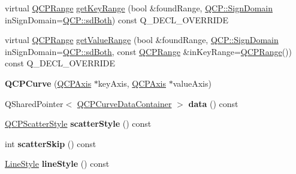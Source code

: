 \begin{DoxyCompactItemize}
\item 
virtual \hyperlink{class_q_c_p_range}{Q\+C\+P\+Range} \hyperlink{class_q_c_p_curve_a22d09087f78f254731197cc0b8783299}{get\+Key\+Range} (bool \&found\+Range, \hyperlink{namespace_q_c_p_afd50e7cf431af385614987d8553ff8a9}{Q\+C\+P\+::\+Sign\+Domain} in\+Sign\+Domain=\hyperlink{namespace_q_c_p_afd50e7cf431af385614987d8553ff8a9a3dee7e9cd2fedce9253b83e172626a6c}{Q\+C\+P\+::sd\+Both}) const Q\+\_\+\+D\+E\+C\+L\+\_\+\+O\+V\+E\+R\+R\+I\+DE
\item 
virtual \hyperlink{class_q_c_p_range}{Q\+C\+P\+Range} \hyperlink{class_q_c_p_curve_a8bb8e3b9085f15921dc40483fb025ab2}{get\+Value\+Range} (bool \&found\+Range, \hyperlink{namespace_q_c_p_afd50e7cf431af385614987d8553ff8a9}{Q\+C\+P\+::\+Sign\+Domain} in\+Sign\+Domain=\hyperlink{namespace_q_c_p_afd50e7cf431af385614987d8553ff8a9a3dee7e9cd2fedce9253b83e172626a6c}{Q\+C\+P\+::sd\+Both}, const \hyperlink{class_q_c_p_range}{Q\+C\+P\+Range} \&in\+Key\+Range=\hyperlink{class_q_c_p_range}{Q\+C\+P\+Range}()) const Q\+\_\+\+D\+E\+C\+L\+\_\+\+O\+V\+E\+R\+R\+I\+DE
\item 
{\bfseries Q\+C\+P\+Curve} (\hyperlink{class_q_c_p_axis}{Q\+C\+P\+Axis} $\ast$key\+Axis, \hyperlink{class_q_c_p_axis}{Q\+C\+P\+Axis} $\ast$value\+Axis)\hypertarget{class_q_c_p_curve_a36de58e2652b3fa47bdf9187d421d3ce}{}\label{class_q_c_p_curve_a36de58e2652b3fa47bdf9187d421d3ce}

\item 
Q\+Shared\+Pointer$<$ \hyperlink{class_q_c_p_data_container}{Q\+C\+P\+Curve\+Data\+Container} $>$ {\bfseries data} () const \hypertarget{class_q_c_p_curve_ad60808afdd4a11b0254e5d14567c20df}{}\label{class_q_c_p_curve_ad60808afdd4a11b0254e5d14567c20df}

\item 
\hyperlink{class_q_c_p_scatter_style}{Q\+C\+P\+Scatter\+Style} {\bfseries scatter\+Style} () const \hypertarget{class_q_c_p_curve_a9ab864c9f6ba0cedf65853f59d867a68}{}\label{class_q_c_p_curve_a9ab864c9f6ba0cedf65853f59d867a68}

\item 
int {\bfseries scatter\+Skip} () const \hypertarget{class_q_c_p_curve_a3f79b67a8e6bd7d30403d802d39bbcf0}{}\label{class_q_c_p_curve_a3f79b67a8e6bd7d30403d802d39bbcf0}

\item 
\hyperlink{class_q_c_p_curve_a2710e9f79302152cff794c6e16cc01f1}{Line\+Style} {\bfseries line\+Style} () const \hypertarget{class_q_c_p_curve_a0314dd644258949aeb4a95cebde5abaf}{}\label{class_q_c_p_curve_a0314dd644258949aeb4a95cebde5abaf}


\end{DoxyCompactItemize}
